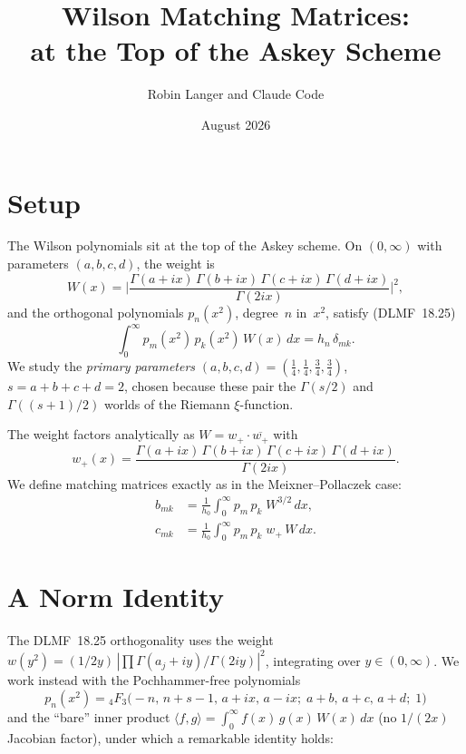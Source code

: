 \documentclass[11pt,a4paper]{article}
\title{\textbf{Wilson Matching Matrices:\\
at the Top of the Askey Scheme}}
\author{Robin Langer and Claude Code}
\date{August 2026}
\begin{document}
\maketitle

\section{Setup}

The Wilson polynomials sit at the top of the Askey scheme.
On $(0,\infty)$ with parameters $(a,b,c,d)$, the weight is
\[
  W(x) = \biggl|\frac{\Gamma(a{+}ix)\,\Gamma(b{+}ix)\,
  \Gamma(c{+}ix)\,\Gamma(d{+}ix)}{\Gamma(2ix)}\biggr|^2,
\]
and the orthogonal polynomials $p_n(x^2)$, degree~$n$ in~$x^2$, satisfy
(DLMF~18.25)
\[
  \int_0^\infty p_m(x^2)\, p_k(x^2)\, W(x)\, dx = h_n\, \delta_{mk}.
\]
We study the \emph{primary parameters}
$(a,b,c,d) = (\tfrac14, \tfrac14, \tfrac34, \tfrac34)$,
$s = a{+}b{+}c{+}d = 2$, chosen because these pair the
$\Gamma(s/2)$ and $\Gamma((s+1)/2)$ worlds of the Riemann
$\xi$-function.

The weight factors analytically as $W = w_+ \cdot \overline{w_+}$ with
\[
  w_+(x) = \frac{\Gamma(a{+}ix)\,\Gamma(b{+}ix)\,
  \Gamma(c{+}ix)\,\Gamma(d{+}ix)}{\Gamma(2ix)}.
\]
We define matching matrices exactly as in the Meixner--Pollaczek case:
\begin{align}
  b_{mk} &= \frac{1}{h_0}\int_0^\infty p_m\, p_k\; W^{3/2}\, dx,
  \label{eq:bdef} \\
  c_{mk} &= \frac{1}{h_0}\int_0^\infty p_m\, p_k\; w_+\, W\, dx.
  \label{eq:cdef}
\end{align}

\section{A Norm Identity}

The DLMF~18.25 orthogonality uses the weight
$w(y^2) = (1/2y)\,|\prod \Gamma(a_j{+}iy)/\Gamma(2iy)|^2$,
integrating over $y \in (0,\infty)$.  We work instead with the
Pochhammer-free polynomials
\[
  p_n(x^2) = {}_4F_3\!\bigl({-}n,\, n{+}s{-}1,\, a{+}ix,\, a{-}ix;\;
  a{+}b,\, a{+}c,\, a{+}d;\; 1\bigr)
\]
and the ``bare'' inner product
$\langle f, g \rangle = \int_0^\infty f(x)\, g(x)\, W(x)\, dx$
(no $1/(2x)$ Jacobian factor), under which a remarkable identity holds:
\end{document}
